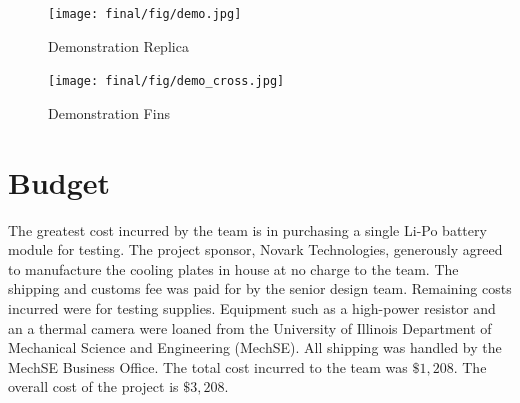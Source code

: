 \documentclass[11pt]{article}
\numberwithin{equation}{subsection} %
\begin{document}
\begin{figure}[!htb]
    \centering
    \texttt{[image: final/fig/demo.jpg]}
    \caption{Demonstration Replica}
    \label{fig:demo1}
\end{figure}

\begin{figure}[!htb]
    \centering
    \texttt{[image: final/fig/demo\_cross.jpg]}
    \caption{Demonstration Fins}
    \label{fig:demo2}
\end{figure}

\section{Budget}\label{section:budget}
The greatest cost incurred by the team is in purchasing a single Li-Po battery module for testing. The project sponsor, Novark Technologies, generously agreed to manufacture the cooling plates in house at no charge to the team. The shipping and customs fee was paid for by the senior design team. Remaining costs incurred were for testing supplies. Equipment such as a high-power resistor and an a thermal camera were loaned from the University of Illinois Department of Mechanical Science and Engineering (MechSE). All shipping was handled by the MechSE Business Office. The total cost incurred to the team was $\$1,208$. The overall cost of the project is $\$3,208$.
\end{document}

